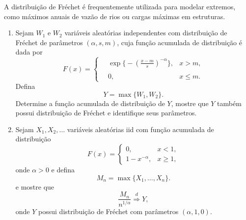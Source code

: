 \begin{exercise}
A distribuição de Fréchet é frequentemente utilizada para modelar extremos, como máximos anuais de vazão de rios ou cargas máximas em estruturas.
\begin{enumerate}[\quad a)]
  \item Sejam $W_1$ e $W_2$ variáveis aleatórias independentes com distribuição de Fréchet de parâmetros $(\alpha,s,m)$, cuja função acumulada de distribuição é dada por
\begin{equation}
  F(x)=
  \begin{cases}
    \quad
    \displaystyle
    \exp\bigg\{
    -\left(\frac{x-m}{s}\right)^{-\alpha}
    \bigg\},
    & x>m,\\
    \\
    \quad
    0, & x \le m.
  \end{cases}
\end{equation}
Defina
\[
Y=\max\{W_1, W_2\}.
\]
 Determine a função acumulada de distribuição de $Y$, mostre que $Y$ também possui distribuição de Fréchet e identifique seus parâmetros.
\item Sejam $X_1,X_2,\dots$ variáveis aleatórias iid com função acumulada de distribuição
\begin{equation}
F(x)=
\begin{cases}
0, & x<1,\\
1-x^{-\alpha}, & x\ge 1,
\end{cases}
\end{equation}
onde $\alpha>0$ e defina
  \begin{equation}
    M_n=\max\{X_1,\dots,X_n\}.
  \end{equation}
  e mostre que
  \begin{equation}
    \frac{M_n}{n^{1/\alpha}}
    \overset{d}{\Longrightarrow}
    Y,
  \end{equation}
  onde $Y$ possui distribuição de Fréchet com parâmetros $(\alpha,1,0)$.
\end{enumerate}
\end{exercise}



